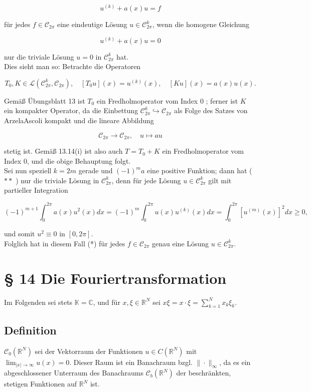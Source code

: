 \documentclass[10pt, letterpaper]{article}
\begin{document}
$$
u^{(k)}+a(x) u=f
$$

für jedes $f \in \mathcal{C}_{2 \pi}$ eine eindeutige Lösung $u \in \mathcal{C}_{2 \pi}^{k}$, wenn die homogene Gleichung

$$
u^{(k)}+a(x) u=0
$$

nur die triviale Lösung $u=0$ in $\mathcal{C}_{2 \pi}^{k}$ hat.\\
Dies sieht man so: Betrachte die Operatoren

$$
T_{0}, K \in \mathcal{L}\left(\mathcal{C}_{2 \pi}^{k}, \mathcal{C}_{2 \pi}\right), \quad\left[T_{0} u\right](x)=u^{(k)}(x), \quad[K u](x)=a(x) u(x) .
$$

Gemäß Übungsblatt 13 ist $T_{0}$ ein Fredholmoperator vom Index 0 ; ferner ist $K$ ein kompakter Operator, da die Einbettung $\mathcal{C}_{2 \pi}^{k} \hookrightarrow \mathcal{C}_{2 \pi}$ als Folge des Satzes von ArzelaAscoli kompakt und die lineare Abbildung

$$
\mathcal{C}_{2 \pi} \rightarrow \mathcal{C}_{2 \pi}, \quad u \mapsto a u
$$

stetig ist. Gemäß 13.14(i) ist also auch $T=T_{0}+K$ ein Fredholmoperator vom Index 0, und die obige Behauptung folgt.\\
Sei nun speziell $k=2 m$ gerade und $(-1)^{m} a$ eine positive Funktion; dann hat ( $* *$ ) nur die triviale Lösung in $\mathcal{C}_{2 \pi}^{k}$, denn für jede Lösung $u \in \mathcal{C}_{2 \pi}^{k}$ gilt mit partieller Integration

$$
(-1)^{m+1} \int_{0}^{2 \pi} a(x) u^{2}(x) d x=(-1)^{m} \int_{0}^{2 \pi} u(x) u^{(k)}(x) d x=\int_{0}^{2 \pi}\left[u^{(m)}(x)\right]^{2} d x \geq 0,
$$

und somit $u^{2} \equiv 0$ in $[0,2 \pi]$.\\
Folglich hat in diesem Fall (*) für jedes $f \in \mathcal{C}_{2 \pi}$ genau eine Lösung $u \in \mathcal{C}_{2 \pi}^{k}$.

\section*{§ 14 Die Fouriertransformation}
Im Folgenden sei stets $\mathbb{K}=\mathbb{C}$, und für $x, \xi \in \mathbb{R}^{N}$ sei $x \xi=x \cdot \xi=\sum_{k=1}^{N} x_{k} \xi_{k}$.

\subsection*{Definition}
$\mathcal{C}_{0}\left(\mathbb{R}^{N}\right)$ sei der Vektorraum der Funktionen $u \in C\left(\mathbb{R}^{N}\right)$ mit $\lim _{|x| \rightarrow \infty} u(x)=0$. Dieser Raum ist ein Banachraum bzgl. $\|\cdot\|_{\infty}$, da es ein abgeschlossener Unterraum des Banachraums $\mathcal{C}_{b}\left(\mathbb{R}^{N}\right)$ der beschränkten, stetigen Funktionen auf $\mathbb{R}^{N}$ ist.
\end{document}
